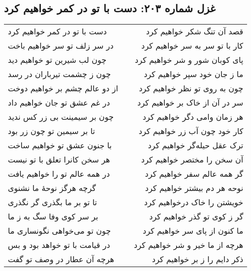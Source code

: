 \begin{center}
\section*{غزل شماره ۲۰۳: دست با تو در کمر خواهیم کرد}
\label{sec:203}
\begin{longtable}{l p{0.5cm} r}
دست با تو در کمر خواهیم کرد
&&
قصد آن تنگ شکر خواهیم کرد
\\
در سر زلف تو سر خواهیم باخت
&&
کار با تو سر به سر خواهیم کرد
\\
چون لب شیرین تو خواهیم دید
&&
پای کوبان شور و شر خواهیم کرد
\\
چون ز چشمت تیرباران در رسد
&&
ما ز جان خود سپر خواهیم کرد
\\
از دو عالم چشم بر خواهیم دوخت
&&
چون به روی تو نظر خواهیم کرد
\\
در غم عشق تو جان خواهیم داد
&&
سر در آن از خاک بر خواهیم کرد
\\
چون بر سیمینت بی زر کس ندید
&&
هر زمان وامی دگر خواهیم کرد
\\
تا بر سیمین تو چون زر بود
&&
کار خود چون آب زر خواهیم کرد
\\
با جنون عشق تو خواهیم ساخت
&&
ترک عقل حیله‌گر خواهیم کرد
\\
هر سخن کانرا تعلق با تو نیست
&&
آن سخن را مختصر خواهیم کرد
\\
در همه عالم تو را خواهیم یافت
&&
گر همه عالم سفر خواهیم کرد
\\
گرچه هرگز نوحهٔ ما نشنوی
&&
نوحه هر دم بیشتر خواهیم کرد
\\
تا تو بر ما بگذری گر نگذری
&&
خویشتن را خاک درخواهیم کرد
\\
بر سر کوی وفا سگ به ز ما
&&
گر ز کوی تو گذر خواهیم کرد
\\
چون تو می‌خواهی نگونساری ما
&&
ما کنون از پای سر خواهیم کرد
\\
در قیامت با تو خواهد بود و بس
&&
هرچه از ما خیر و شر خواهیم کرد
\\
هرچه آن عطار در وصف تو گفت
&&
ذکر دایم را ز بر خواهیم کرد
\\
\end{longtable}
\end{center}
